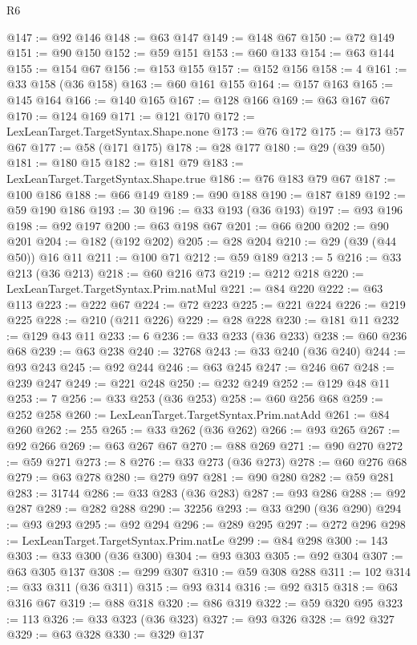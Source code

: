 \begin{lexlean}{R6}
\begin{coremodule}
@147 := @92 @146
@148 := @63 @147
@149 := @148 @67
@150 := @72 @149
@151 := @90 @150
@152 := @59 @151
@153 := @60 @133
@154 := @63 @144
@155 := @154 @67
@156 := @153 @155
@157 := @152 @156
@158 := 4
@161 := @33 @158 (@36 @158)
@163 := @60 @161 @155
@164 := @157 @163
@165 := @145 @164
@166 := @140 @165
@167 := @128 @166
@169 := @63 @167 @67
@170 := @124 @169
@171 := @121 @170
@172 := LexLeanTarget.TargetSyntax.Shape.none
@173 := @76 @172
@175 := @173 @57 @67
@177 := @58 (@171 @175)
@178 := @28 @177
@180 := @29 (@39 @50)
@181 := @180 @15
@182 := @181 @79
@183 := LexLeanTarget.TargetSyntax.Shape.true
@186 := @76 @183 @79 @67
@187 := @100 @186
@188 := @66 @149
@189 := @90 @188
@190 := @187 @189
@192 := @59 @190 @186
@193 := 30
@196 := @33 @193 (@36 @193)
@197 := @93 @196
@198 := @92 @197
@200 := @63 @198 @67
@201 := @66 @200
@202 := @90 @201
@204 := @182 (@192 @202)
@205 := @28 @204
@210 := @29 (@39 (@44 @50)) @16 @11
@211 := @100 @71
@212 := @59 @189
@213 := 5
@216 := @33 @213 (@36 @213)
@218 := @60 @216 @73
@219 := @212 @218
@220 := LexLeanTarget.TargetSyntax.Prim.natMul
@221 := @84 @220
@222 := @63 @113
@223 := @222 @67
@224 := @72 @223
@225 := @221 @224
@226 := @219 @225
@228 := @210 (@211 @226)
@229 := @28 @228
@230 := @181 @11
@232 := @129 @43 @11
@233 := 6
@236 := @33 @233 (@36 @233)
@238 := @60 @236 @68
@239 := @63 @238
@240 := 32768
@243 := @33 @240 (@36 @240)
@244 := @93 @243
@245 := @92 @244
@246 := @63 @245
@247 := @246 @67
@248 := @239 @247
@249 := @221 @248
@250 := @232 @249
@252 := @129 @48 @11
@253 := 7
@256 := @33 @253 (@36 @253)
@258 := @60 @256 @68
@259 := @252 @258
@260 := LexLeanTarget.TargetSyntax.Prim.natAdd
@261 := @84 @260
@262 := 255
@265 := @33 @262 (@36 @262)
@266 := @93 @265
@267 := @92 @266
@269 := @63 @267 @67
@270 := @88 @269
@271 := @90 @270
@272 := @59 @271
@273 := 8
@276 := @33 @273 (@36 @273)
@278 := @60 @276 @68
@279 := @63 @278
@280 := @279 @97
@281 := @90 @280
@282 := @59 @281
@283 := 31744
@286 := @33 @283 (@36 @283)
@287 := @93 @286
@288 := @92 @287
@289 := @282 @288
@290 := 32256
@293 := @33 @290 (@36 @290)
@294 := @93 @293
@295 := @92 @294
@296 := @289 @295
@297 := @272 @296
@298 := LexLeanTarget.TargetSyntax.Prim.natLe
@299 := @84 @298
@300 := 143
@303 := @33 @300 (@36 @300)
@304 := @93 @303
@305 := @92 @304
@307 := @63 @305 @137
@308 := @299 @307
@310 := @59 @308 @288
@311 := 102
@314 := @33 @311 (@36 @311)
@315 := @93 @314
@316 := @92 @315
@318 := @63 @316 @67
@319 := @88 @318
@320 := @86 @319
@322 := @59 @320 @95
@323 := 113
@326 := @33 @323 (@36 @323)
@327 := @93 @326
@328 := @92 @327
@329 := @63 @328
@330 := @329 @137

\end{coremodule}
\end{lexlean}
